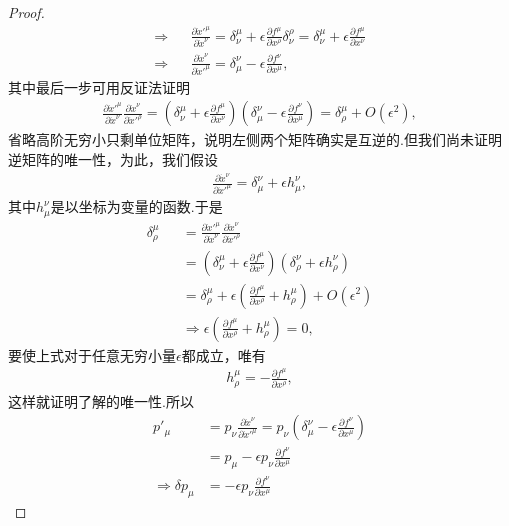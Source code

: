 \begin{proof}
\begin{eqnarray*}
			\Rightarrow&&\frac{\partial \dot{x}'^\mu}{\partial \dot{x}^\nu}=\delta^\mu_\nu+\epsilon \frac{\partial f^\mu}{\partial x^\rho}\delta^\rho_\nu=\delta^\mu_\nu+\epsilon \frac{\partial f^\mu}{\partial x^\nu}\\
			\Rightarrow&&\frac{\partial \dot{x}^\nu}{\partial \dot{x}'^\mu}=\delta^\nu_\mu-\epsilon \frac{\partial f^\nu}{\partial x^\mu},
		\end{eqnarray*}
		其中最后一步可用反证法证明
		\begin{eqnarray*}
			\frac{\partial \dot{x}'^\mu}{\partial \dot{x}^\nu}\frac{\partial \dot{x}^\nu}{\partial \dot{x}'^\rho}=\left(\delta^\mu_\nu+\epsilon \frac{\partial f^\mu}{\partial x^\nu}\right)\left(\delta^\nu_\mu-\epsilon \frac{\partial f^\nu}{\partial x^\mu}\right)=\delta^\mu_\rho+O(\epsilon^2),
		\end{eqnarray*}
		省略高阶无穷小只剩单位矩阵，说明左侧两个矩阵确实是互逆的.但我们尚未证明逆矩阵的唯一性，为此，我们假设
		\begin{eqnarray*}
			\frac{\partial \dot{x}^\nu}{\partial \dot{x}'^\mu}=\delta^\nu_\mu+\epsilon h^\nu_\mu,
		\end{eqnarray*}
		其中$h^\nu_\mu$是以坐标为变量的函数.于是
		\begin{eqnarray*}
			\delta^\mu_\rho&&=\frac{\partial \dot{x}'^\mu}{\partial \dot{x}^\nu}\frac{\partial \dot{x}^\nu}{\partial \dot{x}'^\rho}\\
			&&=\left(\delta^\mu_\nu+\epsilon \frac{\partial f^\mu}{\partial x^\nu}\right)\left(\delta^\nu_\rho+\epsilon h^\nu_\rho\right)\\
			&&=\delta^\mu_\rho+\epsilon\left(\frac{\partial f^\mu}{\partial x^\rho}+h^\mu_\rho\right)+O(\epsilon^2)\\
			&&\Rightarrow\epsilon\left(\frac{\partial f^\mu}{\partial x^\rho}+h^\mu_\rho\right)=0,
		\end{eqnarray*}
		要使上式对于任意无穷小量$\epsilon$都成立，唯有	
		\begin{eqnarray*}
			h^\mu_\rho=-\frac{\partial f^\mu}{\partial x^\rho},
		\end{eqnarray*}
		这样就证明了解的唯一性.所以
		\begin{equation}\label{pr:delta p}
		\begin{split}
			p'_\mu&=p_\nu\frac{\partial \dot{x}^\nu}{\partial \dot{x}'^\mu}=p_\nu\left(\delta^\nu_\mu-\epsilon \frac{\partial f^\nu}{\partial x^\mu}\right)\\
			&=p_\mu-\epsilon p_\nu\frac{\partial f^\nu}{\partial x^\mu}\\
			\Rightarrow\delta p_\mu&=-\epsilon p_\nu\frac{\partial f^\nu}{\partial x^\mu}

\end{split}
\end{equation}
\end{proof}

